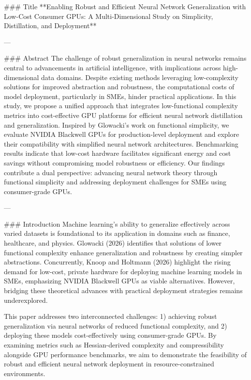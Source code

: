### Title  
**Enabling Robust and Efficient Neural Network Generalization with Low-Cost Consumer GPUs: A Multi-Dimensional Study on Simplicity, Distillation, and Deployment**

---

### Abstract  
The challenge of robust generalization in neural networks remains central to advancements in artificial intelligence, with implications across high-dimensional data domains. Despite existing methods leveraging low-complexity solutions for improved abstraction and robustness, the computational costs of model deployment, particularly in SMEs, hinder practical applications. In this study, we propose a unified approach that integrates low-functional complexity metrics into cost-effective GPU platforms for efficient neural network distillation and generalization. Inspired by Glowacki's work on functional simplicity, we evaluate NVIDIA Blackwell GPUs for production-level deployment and explore their compatibility with simplified neural network architectures. Benchmarking results indicate that low-cost hardware facilitates significant energy and cost savings without compromising model robustness or efficiency. Our findings contribute a dual perspective: advancing neural network theory through functional simplicity and addressing deployment challenges for SMEs using consumer-grade GPUs.

---

### Introduction  
Machine learning's ability to generalize effectively across varied datasets is foundational to its application in domains such as finance, healthcare, and physics. Glowacki (2026) identifies that solutions of lower functional complexity enhance generalization and robustness by creating simpler abstractions. Concurrently, Knoop and Holtmann (2026) highlight the rising demand for low-cost, private hardware for deploying machine learning models in SMEs, emphasizing NVIDIA Blackwell GPUs as viable alternatives. However, bridging these theoretical advances with practical deployment strategies remains underexplored.

This paper addresses two interconnected challenges: 1) achieving robust generalization via neural networks of reduced functional complexity, and 2) deploying these models cost-effectively using consumer-grade GPUs. By examining metrics such as Hessian-derived complexity and compressibility alongside GPU performance benchmarks, we aim to demonstrate the feasibility of robust and efficient neural network deployment in resource-constrained environments.

